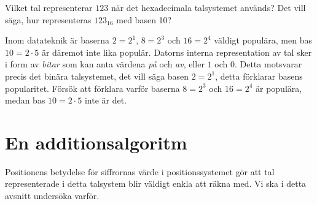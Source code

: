 \begin{exercise}
  Vilket tal representerar \(123\) när det hexadecimala talsystemet används?
  Det vill säga, hur representeras \(123_{16}\) med basen 10?
\end{exercise}

\begin{exercise}\label{xrc:TalbasDatavetenskap}
  Inom datateknik är baserna \(2=2^1\), \(8=2^3\) och \(16=2^4\) väldigt
  populära, men bas \(10=2\cdot5\) är däremot inte lika populär.
  Datorns interna representation av tal sker i form av \emph{bitar} som kan
  anta värdena \emph{på} och \emph{av}, eller \(1\) och \(0\).
  Detta motsvarar precis det binära talsystemet, det vill säga basen
  \(2=2^1\), detta förklarar basens popularitet.
  Försök att förklara varför baserna \(8=2^3\) och \(16=2^4\) är populära,
  medan bas \(10=2\cdot5\) inte är det.
\end{exercise}



\section{En additionsalgoritm}
Positionens betydelse för siffrornas värde i positionssystemet gör
att tal representerade i detta talsystem blir väldigt enkla att räkna med.
Vi ska i detta avsnitt undersöka varför.

